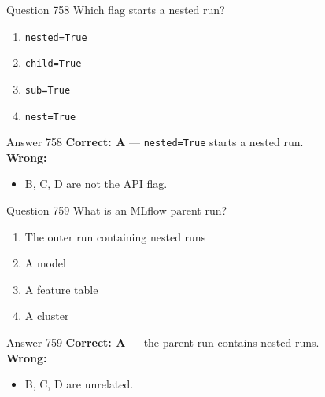 \documentclass[aspectratio=169,11pt]{beamer}
\begin{document}
	\begin{frame}{Question 758}
		Which flag starts a nested run?
		\begin{enumerate}[label=\Alph*.]
			\item \texttt{nested=True}
			\item \texttt{child=True}
			\item \texttt{sub=True}
			\item \texttt{nest=True}
		\end{enumerate}
	\end{frame}
	\begin{frame}{Answer 758}
		\textbf{Correct: A} --- \texttt{nested=True} starts a nested run.\\
		\vspace{0.5em}
		\textbf{Wrong:}
		\begin{itemize}
			\item B, C, D are not the API flag.
		\end{itemize}
	\end{frame}
	
	\begin{frame}{Question 759}
		What is an MLflow parent run?
		\begin{enumerate}[label=\Alph*.]
			\item The outer run containing nested runs
			\item A model
			\item A feature table
			\item A cluster
		\end{enumerate}
	\end{frame}
	\begin{frame}{Answer 759}
		\textbf{Correct: A} --- the parent run contains nested runs.\\
		\vspace{0.5em}
		\textbf{Wrong:}
		\begin{itemize}
			\item B, C, D are unrelated.
		\end{itemize}
	\end{frame}
	
\end{document}
